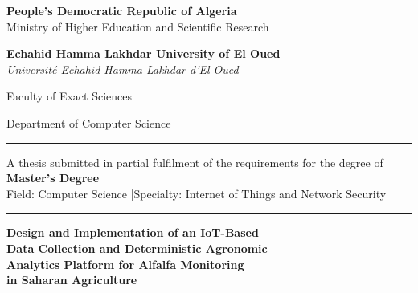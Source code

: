 
\begin{titlepage}
\centering

{\small\textbf{People's Democratic Republic of Algeria}\\
Ministry of Higher Education and Scientific Research}

\vspace{0.4cm}

{\normalsize\textbf{Echahid Hamma Lakhdar University of El Oued}\\
\textit{Université Echahid Hamma Lakhdar d'El Oued}}

\vspace{0.3cm}

{\normalsize Faculty of Exact Sciences\\}

{\normalsize Department of Computer Science}

\vspace{0.6cm}
\rule{\linewidth}{0.6pt}
\vspace{0.3cm}

{\normalsize A thesis submitted in partial fulfilment of the requirements for the degree of\\}
\vspace{0.2cm}
{\large\textbf{Master's Degree}}\\
\vspace{0.1cm}
{\normalsize Field: Computer Science \quad|\quad Specialty: Internet of Things and Network Security}

\vspace{0.6cm}
\rule{\linewidth}{0.6pt}
\vspace{0.5cm}

{\LARGE\bfseries
Design and Implementation of an IoT-Based\\
Data Collection and Deterministic Agronomic\\
Analytics Platform for Alfalfa Monitoring\\
in Saharan Agriculture\par}


\end{titlepage}

